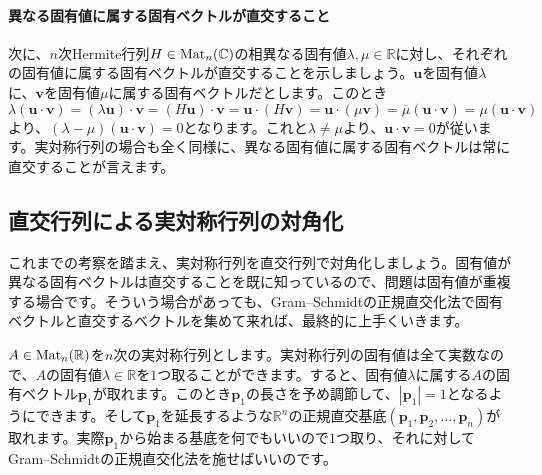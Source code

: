 \paragraph{異なる固有値に属する固有ベクトルが直交すること}

次に、$n$次Hermite行列$H \in \operatorname{Mat}_n(\mathbb{C})$の相異なる固有値$\lambda, \mu \in \mathbb{R}$に対し、それぞれの固有値に属する固有ベクトルが直交することを示しましょう。$\bm{u}$を固有値$\lambda$に、$\bm{v}$を固有値$\mu$に属する固有ベクトルだとします。このとき
\[
\lambda (\bm{u} \cdot \bm{v}) = (\lambda \bm{u}) \cdot \bm{v} = (H\bm{u}) \cdot \bm{v} = \bm{u} \cdot (H\bm{v}) = \bm{u} \cdot (\mu\bm{v}) = \overline{\mu} (\bm{u} \cdot \bm{v}) = \mu (\bm{u} \cdot \bm{v})
\]
より、$(\lambda - \mu)(\bm{u} \cdot \bm{v}) = 0$となります。これと$\lambda \neq \mu$より、$\bm{u} \cdot \bm{v} = 0$が従います。実対称行列の場合も全く同様に、異なる固有値に属する固有ベクトルは常に直交することが言えます。

\subsection{直交行列による実対称行列の対角化}

これまでの考察を踏まえ、実対称行列を直交行列で対角化しましょう。固有値が異なる固有ベクトルは直交することを既に知っているので、問題は固有値が重複する場合です。そういう場合があっても、Gram--Schmidtの正規直交化法で固有ベクトルと直交するベクトルを集めて来れば、最終的に上手くいきます。

$A \in \operatorname{Mat}_n(\mathbb{R})$を$n$次の実対称行列とします。実対称行列の固有値は全て実数なので、$A$の固有値$\lambda \in \mathbb{R}$を$1$つ取ることができます。すると、固有値$\lambda$に属する$A$の固有ベクトル$\bm{p}_1$が取れます。このとき$\bm{p}_1$の長さを予め調節して、$|\bm{p}_1| = 1$となるようにできます。そして$\bm{p}_1$を延長するような$\mathbb{R}^n$の正規直交基底$(\bm{p}_1, \bm{p}_2, \ldots, \bm{p}_n)$が取れます。実際$\bm{p}_1$から始まる基底を何でもいいので$1$つ取り、それに対してGram--Schmidtの正規直交化法を施せばいいのです。

